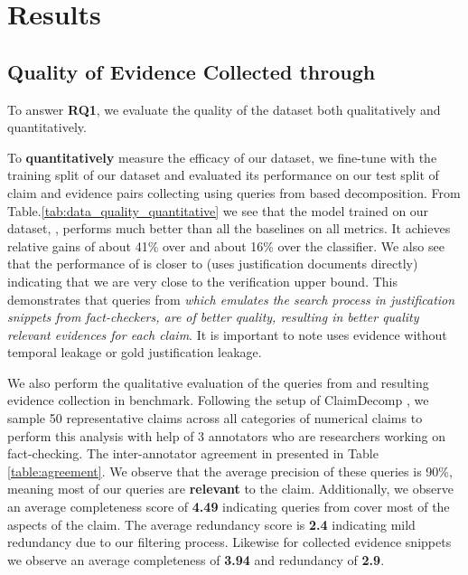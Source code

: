 
\section{Results}

\subsection{Quality of Evidence Collected through \name{}}
To answer \textbf{RQ1}, we evaluate the quality of the \quantempplus{} dataset both qualitatively and quantitatively.

To \textbf{quantitatively} measure the efficacy of our dataset, we fine-tune \robertamnlilarge{} with the training split of our dataset and evaluated its performance on our test split of claim and evidence pairs collecting using queries from \name{} based decomposition. From Table.\ref{tab:data_quality_quantitative} we see that the model trained on our dataset, \robertaqtempplus{}, performs much better than all the baselines on all metrics. It achieves relative gains of about 41\% over \naive{} and about 16\% over the \robertaclaimnoev{} classifier. We also see that the performance of \robertaqtempplus{} is closer to \robertagold{} (uses justification documents directly) indicating that we are very close to the verification upper bound. This demonstrates that queries from \emph{\name{} which emulates the search process in justification snippets from fact-checkers, are of better quality, resulting in better quality relevant evidences for each claim}. It is important to note \robertaqtempplus{} uses evidence without temporal leakage or gold justification leakage.

We also perform the qualitative evaluation of the queries from \name{} and resulting evidence collection in \quantempplus{} benchmark. Following the setup of ClaimDecomp \cite{claimdecomp}, we sample 50 representative claims across all categories of numerical claims to perform this analysis with help of 3 annotators who are researchers working on fact-checking. The inter-annotator agreement in presented in Table \ref{table:agreement}. We observe that the average precision of these queries is 90\%, meaning most of our queries are \textbf{relevant} to the claim. Additionally, we observe an average completeness score of \textbf{4.49} indicating queries from \name{} cover most of the aspects of the claim. The average redundancy score is \textbf{2.4} indicating mild redundancy due to our filtering process. Likewise for collected evidence snippets we observe an average completeness of \textbf{3.94} and redundancy of \textbf{2.9}.

